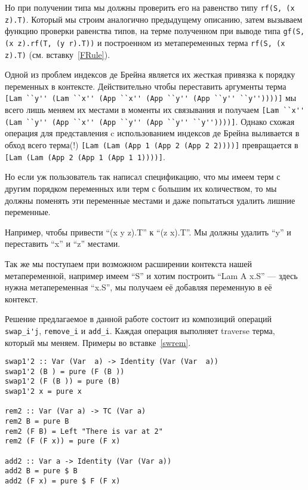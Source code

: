 Но при получении типа мы должны проверить его на равенство типу  \lstinline{rf(S, (x z).T)}. Который мы строим аналогично предыдущему описанию, затем вызываем функцию проверки равенства типов, на терме полученном при выводе типа \lstinline{gf(S, (x z).rf(T, (y r).T))} и построенном из метапеременных терма \lstinline{rf(S, (x z).T)} (см. вставку~\ref{FRule}).

\hfill

Одной из проблем индексов де Брейна является их жесткая привязка к порядку переменных в контексте. Действительно чтобы переставить аргументы терма \lstinline{[Lam ``y'' (Lam ``x'' (App ``x'' (App ``y'' (App ``y'' ``y''))))]} мы всего лишь меняем их местами в моменты их связывания и получаем \lstinline{[Lam ``x'' (Lam ``y'' (App ``x'' (App ``y'' (App ``y'' ``y''))))]}. Однако схожая операция для представления c использованием индексов де Брейна выливается в обход всего терма(!) \lstinline{[Lam (Lam (App 1 (App 2 (App 2 2))))]} превращается в \lstinline{[Lam (Lam (App 2 (App 1 (App 1 1))))]}.

Но если уж пользователь так написал спецификацию, что мы имеем терм с другим порядком переменных или терм с большим их количеством, то мы должны поменять эти переменные местами и даже попытаться удалить лишние переменные.

Например, чтобы привести ``(x y z).T'' к ``(z x).T''. Мы должны удалить ``y'' и переставить ``x'' и ``z'' местами.

Так же мы поступаем при возможном расширении контекста нашей метапеременной, например имеем ``S'' и хотим построить ``Lam A x.S'' --- здесь нужна метапеременная ``x.S'', мы получаем её добавляя переменную в её контекст.

Решение предлагаемое в данной работе состоит из композиций операций \lstinline{swap_i'j}, \lstinline{remove_i} и \lstinline{add_i}. Каждая операция выполняет traverse терма, который мы меняем. Примеры во вставке~\ref{swrem}.

\begin{lstlisting}[label={swrem}, caption={Примеры функций},captionpos=b, frame=single, float, floatplacement=H]
swap1'2 :: Var (Var  a) -> Identity (Var (Var  a))
swap1'2 (B ) = pure (F (B ))
swap1'2 (F (B )) = pure (B)
swap1'2 x = pure x

rem2 :: Var (Var a) -> TC (Var a)
rem2 B = pure B
rem2 (F B) = Left "There is var at 2"
rem2 (F (F x)) = pure (F x)

add2 :: Var a -> Identity (Var (Var a))
add2 B = pure $ B
add2 (F x) = pure $ F (F x)
\end{lstlisting}

